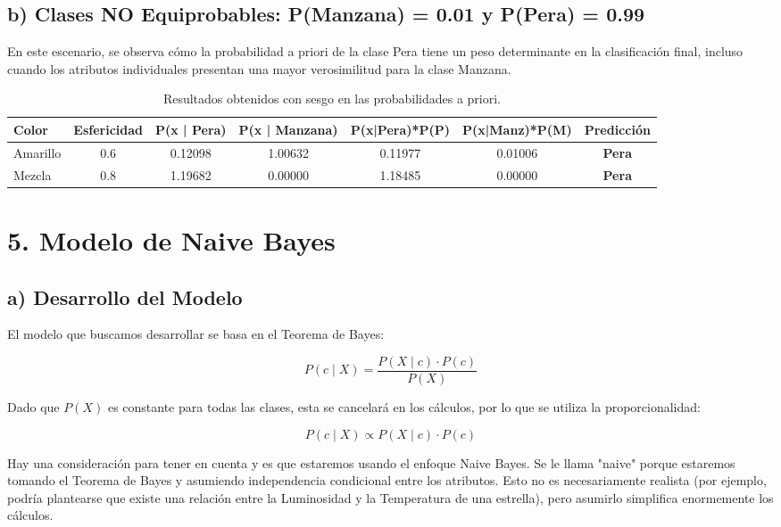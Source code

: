 \documentclass[11pt,a4paper]{article}
\begin{document}
\subsection*{b) Clases NO Equiprobables: P(Manzana) = 0.01 y P(Pera) = 0.99}

En este escenario, se observa cómo la probabilidad a priori de la clase Pera tiene un peso determinante en la clasificación final, incluso cuando los atributos individuales presentan una mayor verosimilitud para la clase Manzana.

\begin{table}[H]
\centering
\begin{adjustbox}{width=\textwidth}
\begin{tabular}{|l|c|c|c|c|c|c|}
\hline
\textbf{Color} & \textbf{Esfericidad} & \textbf{P(x | Pera)} & \textbf{P(x | Manzana)} & \textbf{P(x|Pera)*P(P)} & \textbf{P(x|Manz)*P(M)} & \textbf{Predicción} \\ \hline
Amarillo & 0.6 & 0.12098 & 1.00632 & 0.11977 & 0.01006 & \textbf{Pera} \\ \hline
Mezcla & 0.8 & 1.19682 & 0.00000 & 1.18485 & 0.00000 & \textbf{Pera} \\ \hline
\end{tabular}
\end{adjustbox}
\caption{Resultados obtenidos con sesgo en las probabilidades a priori.}
\end{table}

\newpage
\section*{5. Modelo de Naive Bayes}
\subsection*{a) Desarrollo del Modelo}
El modelo que buscamos desarrollar se basa en el Teorema de Bayes:

\[
P(c \mid X) = \frac{P(X \mid c)\cdot P(c)}{P(X)}
\]

Dado que $P(X)$ es constante para todas las clases, esta se cancelará en los cálculos, por lo que se utiliza la proporcionalidad:

\[
P(c \mid X) \propto P(X \mid c)\cdot P(c)
\]

Hay una consideración para tener en cuenta y es que estaremos usando el enfoque Naive Bayes. Se le llama "naive" porque estaremos tomando el Teorema de Bayes y asumiendo independencia condicional entre los atributos. Esto no es necesariamente realista (por ejemplo, podría plantearse que existe una relación entre la Luminosidad y la Temperatura de una estrella), pero asumirlo simplifica enormemente los cálculos.
\end{document}

